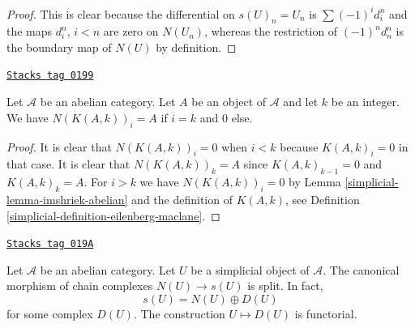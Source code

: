 \begin{proof}
This is clear because the differential
on $s(U)_n = U_n$ is $\sum (-1)^i d^n_i$ and
the maps $d^n_i$, $i < n$ are zero on $N(U_n)$,
whereas the restriction of $(-1)^nd^n_n$ is the boundary
map of $N(U)$ by definition.
\end{proof}

\begin{lemma}[N K]
\label{simplicial-lemma-N-K}
\href{https://stacks.math.columbia.edu/tag/0199}{\texttt{Stacks tag 0199}}

Let $\mathcal{A}$ be an abelian category.
Let $A$ be an object of $\mathcal{A}$ and
let $k$ be an integer. We have
$N(K(A, k))_i = A$ if $i = k$ and
$0$ else.
\end{lemma}

\begin{proof}

It is clear that $N(K(A, k))_i = 0$ when $i < k$
because $K(A, k)_i = 0$ in that case.
It is clear that $N(K(A, k))_k = A$ since
$K(A, k)_{k - 1} = 0$ and $K(A, k)_k = A$.
For $i > k$ we have $N(K(A, k))_i = 0$
by Lemma \ref{simplicial-lemma-imshriek-abelian} and
the definition of $K(A, k)$, see Definition
\ref{simplicial-definition-eilenberg-maclane}.
\end{proof}

\begin{lemma}
\label{simplicial-lemma-decompose-associated-complexes}
\href{https://stacks.math.columbia.edu/tag/019A}{\texttt{Stacks tag 019A}}

Let $\mathcal{A}$ be an abelian category.
Let $U$ be a simplicial object of $\mathcal{A}$.
The canonical morphism of chain complexes
$N(U) \to s(U)$ is split. In fact,
$$
s(U) = N(U) \oplus D(U)
$$
for some complex $D(U)$. The construction $U \mapsto D(U)$
is functorial.
\end{lemma}

